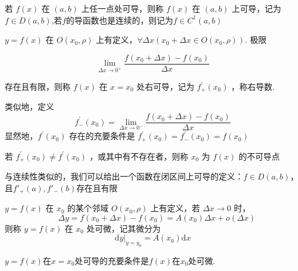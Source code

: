 若 $f(x)$ 在 $(a, b)$ 上任一点处可导，则称 $f(x)$ 在 $(a, b)$ 上可导，记为$f\in D(a,b)$,若$f$的导函数也是连续的，则记为$f\in C^1(a,b)$
\begin{definition}
	$ y=f(x)$ 在 $O\left(x_0, \rho\right)$ 上有定义，$\forall \Delta x\left(x_0+\Delta x \in O\left(x_0, \rho\right)\right).$ 
	极限
	
	$$
	\lim _{\Delta x \rightarrow 0^{+}} \frac{f\left(x_0+\Delta x\right)-f\left(x_0\right)}{\Delta x}
	$$
	
	
	存在且有限，则称 $f(x)$ 在 $x=x_0$ 处右可导，记为 $f^{\prime}_{+}\left(x_0\right)$ ，称右导数.
	
	类似地，定义 $$f^{\prime}_{-}\left(x_0\right)=\lim _{\Delta x \rightarrow 0^{-}} \frac{f\left(x_0+\Delta x\right)-f\left(x_0\right)}{\Delta x}$$
	显然地，$f^{\prime}\left(x_0\right)$ 存在的充要条件是 $f_{+}^{\prime}\left(x_0\right)=f_{-}^{\prime}\left(x_0\right)=f\left(x_0\right)$
	
	若 $f^{\prime}_{+}\left(x_0\right) \neq f^{\prime}\left(x_0\right)$ ，或其中有不存在者，则称 $x_0$ 为 $f(x)$ 的不可导点
	
	与连续性类似的，我们可以给出一个函数在闭区间上可导的定义：$f\in D(a,b)$，且$f'_{+}(a),f'_{-}(b)$存在且有限
\end{definition}
\begin{definition}
	$y=f(x)$ 在 $x_0$ 的某个邻域 $O\left(x_0, \rho\right)$ 上有定义，若 $\Delta x \rightarrow 0$ 时，$$\quad \Delta y=f\left(x_0+\Delta x\right)-f\left(x_0\right)=A\left(x_0\right) \Delta x+o(\Delta x)$$则称 $y=f(x)$ 在 $x_0$ 处可微，记其微分为
	$$\mathrm{d} y|_{y=y_0}=A\left(x_0\right) \mathrm{d} x$$
\end{definition}
\begin{theorem}
	$y=f(x)$在$x=x_0$处可导的充要条件是$f(x)$在$x_0$处可微.
\end{theorem}
